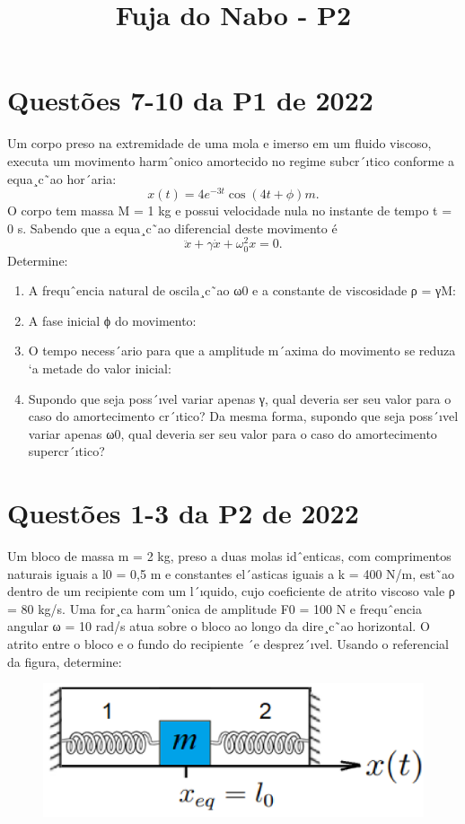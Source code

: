 \documentclass[a4paper,12pt]{article}
\title{\Huge{\textbf{Fuja do Nabo - P2}}}
\date{\vspace{-10ex}}
\begin{document}
\maketitle

\section{Questões 7-10 da P1 de 2022}

Um corpo preso na extremidade de uma mola e imerso em um
fluido viscoso, executa um movimento harmˆonico amortecido no regime subcr´ıtico conforme a equa¸c˜ao
hor´aria:
$$
x(t) = 4 e^{-3t} \cos(4t + \phi) \unit{m}.
$$
O corpo tem massa M = 1 kg e possui velocidade nula no instante de tempo t = 0 s. Sabendo que
a equa¸c˜ao diferencial deste movimento é
$$
\ddot{x} + \gamma \dot{x} + \omega_0^2x = 0.
$$
Determine:

\begin{enumerate}
\item A frequˆencia natural de oscila¸c˜ao ω0 e a constante de viscosidade ρ = γM:

\item A fase inicial ϕ do movimento:

\item O tempo necess´ario para que a amplitude m´axima do movimento se reduza `a metade do valor inicial:

\item Supondo que seja poss´ıvel variar apenas γ, qual deveria ser seu valor para o caso
do amortecimento cr´ıtico? Da mesma forma, supondo que seja poss´ıvel variar apenas ω0, qual
deveria ser seu valor para o caso do amortecimento supercr´ıtico?
\end{enumerate}

\section{Questões 1-3 da P2 de 2022}

Um bloco de massa m = 2 kg, preso a duas molas idˆenticas, com
comprimentos naturais iguais a l0 = 0,5 m e constantes el´asticas iguais a k = 400 N/m, est˜ao dentro
de um recipiente com um l´ıquido, cujo coeficiente de atrito viscoso vale ρ = 80 kg/s. Uma for¸ca
harmˆonica de amplitude F0 = 100 N e frequˆencia angular ω = 10 rad/s atua sobre o bloco ao
longo da dire¸c˜ao horizontal. O atrito entre o bloco e o fundo do recipiente ´e desprez´ıvel. Usando o
referencial da figura, determine:
\begin{figure}[H]
\centering
\includegraphics[width=0.6\linewidth]{fig/duas_molas.png}
\label{fig:duas_molas}
\end{figure}
\end{document}
